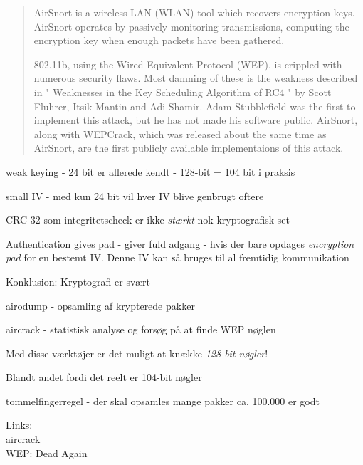 

\begin{quote}
AirSnort is a wireless LAN (WLAN) tool which recovers encryption
keys. AirSnort operates by passively monitoring transmissions,
computing the encryption key when enough packets have been gathered.  

802.11b, using the Wired Equivalent Protocol (WEP), is crippled with
numerous security flaws. Most damning of these is the weakness
described in " Weaknesses in the Key Scheduling Algorithm of RC4 "
by Scott Fluhrer, Itsik Mantin and Adi Shamir. Adam Stubblefield
was the first to implement this attack, but he has not made his
software public. AirSnort, along with WEPCrack, which was released
about the same time as AirSnort, are the first publicly available
implementaions of this attack.  
\end{quote}



\begin{list1}
\item weak keying - 24 bit er allerede kendt - 128-bit = 104 bit i praksis
\item small IV - med kun 24 bit vil hver IV blive genbrugt oftere
\item CRC-32 som integritetscheck er ikke \emph{stærkt} nok
  kryptografisk set
\item Authentication gives pad - giver fuld adgang - hvis der bare
  opdages \emph{encryption pad} for en bestemt IV. Denne IV kan så
  bruges til al fremtidig kommunikation
\end{list1}

{\hlkbig Konklusion: Kryptografi er svært}



\begin{list1}
\item airodump - opsamling af krypterede pakker
\item aircrack - statistisk analyse og forsøg på at finde WEP nøglen
\item Med disse værktøjer er det muligt at knække \emph{128-bit nøgler}!
\item Blandt andet fordi det reelt er 104-bit nøgler \smiley
\item tommelfingerregel - der skal opsamles mange pakker ca. 100.000
  er godt
\item Links:\\
 aircrack\\
 WEP: Dead Again
\end{list1}

